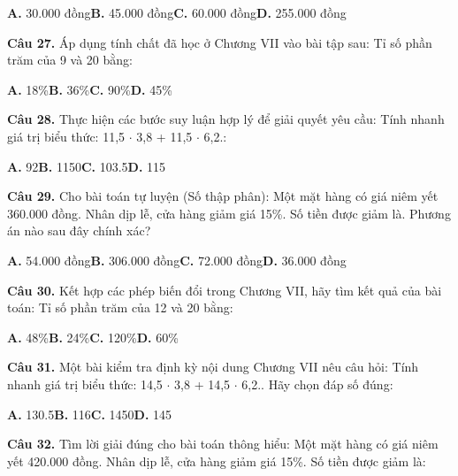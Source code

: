 \documentclass[11pt,a4paper]{article}
\begin{document}
\hspace*{1.5em}\textbf{A.} 30.000 đồng\quad\quad \textbf{B.} 45.000 đồng\quad\quad \textbf{C.} 60.000 đồng\quad\quad \textbf{D.} 255.000 đồng\par\vspace{2pt}
\textbf{\color{primary} Câu 27.} Áp dụng tính chất đã học ở Chương VII vào bài tập sau: Tỉ số phần trăm của 9 và 20 bằng:\par
\hspace*{1.5em}\textbf{A.} 18\%\quad\quad \textbf{B.} 36\%\quad\quad \textbf{C.} 90\%\quad\quad \textbf{D.} 45\%\par\vspace{2pt}
\textbf{\color{primary} Câu 28.} Thực hiện các bước suy luận hợp lý để giải quyết yêu cầu: Tính nhanh giá trị biểu thức: 11,5 $\cdot$ 3,8 + 11,5 $\cdot$ 6,2.:\par
\hspace*{1.5em}\textbf{A.} 92\quad\quad \textbf{B.} 1150\quad\quad \textbf{C.} 103.5\quad\quad \textbf{D.} 115\par\vspace{2pt}
\textbf{\color{primary} Câu 29.} Cho bài toán tự luyện (Số thập phân): Một mặt hàng có giá niêm yết 360.000 đồng. Nhân dịp lễ, cửa hàng giảm giá 15\%. Số tiền được giảm là. Phương án nào sau đây chính xác?\par
\hspace*{1.5em}\textbf{A.} 54.000 đồng\quad\quad \textbf{B.} 306.000 đồng\quad\quad \textbf{C.} 72.000 đồng\quad\quad \textbf{D.} 36.000 đồng\par\vspace{2pt}
\textbf{\color{primary} Câu 30.} Kết hợp các phép biến đổi trong Chương VII, hãy tìm kết quả của bài toán: Tỉ số phần trăm của 12 và 20 bằng:\par
\hspace*{1.5em}\textbf{A.} 48\%\quad\quad \textbf{B.} 24\%\quad\quad \textbf{C.} 120\%\quad\quad \textbf{D.} 60\%\par\vspace{2pt}
\textbf{\color{primary} Câu 31.} Một bài kiểm tra định kỳ nội dung Chương VII nêu câu hỏi: Tính nhanh giá trị biểu thức: 14,5 $\cdot$ 3,8 + 14,5 $\cdot$ 6,2.. Hãy chọn đáp số đúng:\par
\hspace*{1.5em}\textbf{A.} 130.5\quad\quad \textbf{B.} 116\quad\quad \textbf{C.} 1450\quad\quad \textbf{D.} 145\par\vspace{2pt}
\textbf{\color{primary} Câu 32.} Tìm lời giải đúng cho bài toán thông hiểu: Một mặt hàng có giá niêm yết 420.000 đồng. Nhân dịp lễ, cửa hàng giảm giá 15\%. Số tiền được giảm là:\par
\end{document}
